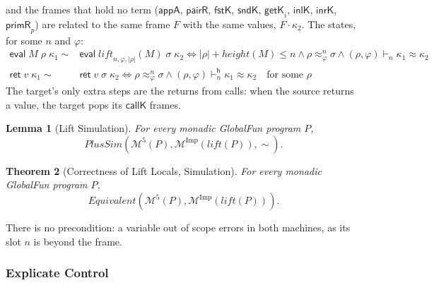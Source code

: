 \documentclass[10pt]{article}
\theoremstyle{acmplain}
\newtheorem{theorem}{Theorem}[section]
\newtheorem{lemma}[theorem]{Lemma}
\newcommand{\key}[1]{\mathsf{#1}}
\newcommand{\pass}[1]{\mathit{#1}}
\newcommand{\ev}[3]{\key{eval}\;#1\;#2\;#3}
\newcommand{\rt}[2]{\key{ret}\;#1\;#2}
\newcommand{\Mach}[1]{\mathcal{M}^{#1}}
\newcommand{\Equiv}{\mathit{Equivalent}}
\newcommand{\evi}[3]{\key{eval}\;#1\;#2\;#3}
\newcommand{\rti}[3]{\key{ret}\;#1\;#2\;#3}
\begin{document}
and the frames that hold no term ($\key{appA}$, $\key{pairR}$, $\key{fstK}$,
$\key{sndK}$, $\key{getK}_i$, $\key{inlK}$, $\key{inrK}$, $\key{primR}_p$)
are related to the same frame $F$ with the same values, $F \cdot \kappa_2$. The states, for some
$n$ and $\varphi$:
\begin{align*}
  \ev{M}{\rho}{\kappa_1} \sim {}& \evi{\pass{lift}_{n,\varphi,|\rho|}(M)}{\sigma}{\kappa_2}
    \iff |\rho| + \mathit{height}(M) \leq n \land \rho \approx^n_\varphi \sigma
      \land (\rho, \varphi) \vdash_n \kappa_1 \approx \kappa_2 \\
  \rt{v}{\kappa_1} \sim {}& \rti{v}{\sigma}{\kappa_2}
    \iff \rho \approx^n_\varphi \sigma \land (\rho, \varphi) \vdash^{\mathsf{h}}_n \kappa_1 \approx \kappa_2
    \quad \text{for some } \rho
\end{align*}
The target's only extra steps are the returns from calls: when the source
returns a value, the target pops its $\key{callK}$ frames.

\begin{lemma}[Lift Simulation]\label{lem:lift-fsim}
For every monadic GlobalFun program $P$,
\[
  \mathit{PlusSim}(\Mach{5}(P), \Mach{\mathrm{Imp}}(\pass{lift}(P)), \sim) .
\]
\end{lemma}

\begin{theorem}[Correctness of Lift Locals, Simulation]\label{thm:lift-sim}
For every monadic GlobalFun program $P$,
\[
  \Equiv(\Mach{5}(P), \Mach{\mathrm{Imp}}(\pass{lift}(P))) .
\]
\end{theorem}
There is no precondition: a variable out of scope errors in both
machines, as its slot $n$ is beyond the frame.

\subsubsection{Explicate Control}\label{sec:sim-explicate}
\end{document}
